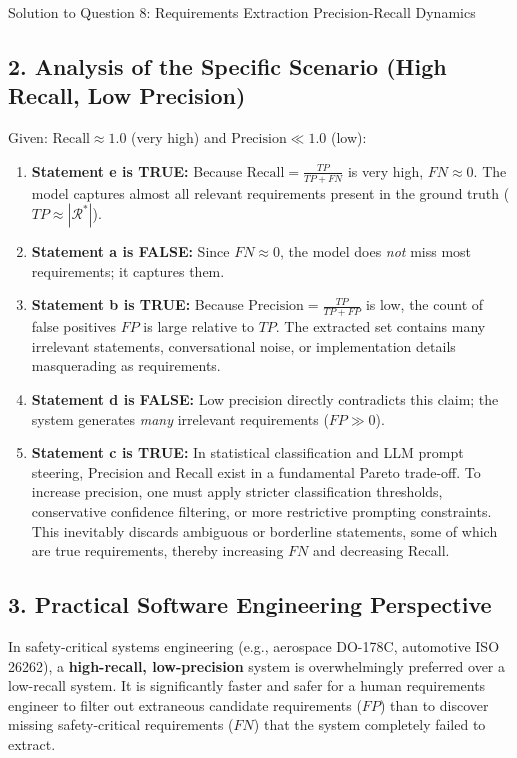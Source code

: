 \documentclass[11pt,a4paper]{article}
\begin{document}
\begin{solutionbox}{Solution to Question 8: Requirements Extraction Precision-Recall Dynamics}
\subsection*{2. Analysis of the Specific Scenario (High Recall, Low Precision)}
Given: $\text{Recall} \approx 1.0$ (very high) and $\text{Precision} \ll 1.0$ (low):
\begin{enumerate}[label=\textbf{(\alph*)},leftmargin=1.5em,itemsep=2pt]
    \item \textbf{Statement e is TRUE:} Because $\text{Recall} = \frac{TP}{TP + FN}$ is very high, $FN \approx 0$. The model captures almost all relevant requirements present in the ground truth ($TP \approx |\mathcal{R}^*|$).
    \item \textbf{Statement a is FALSE:} Since $FN \approx 0$, the model does \textit{not} miss most requirements; it captures them.
    \item \textbf{Statement b is TRUE:} Because $\text{Precision} = \frac{TP}{TP + FP}$ is low, the count of false positives $FP$ is large relative to $TP$. The extracted set contains many irrelevant statements, conversational noise, or implementation details masquerading as requirements.
    \item \textbf{Statement d is FALSE:} Low precision directly contradicts this claim; the system generates \textit{many} irrelevant requirements ($FP \gg 0$).
    \item \textbf{Statement c is TRUE:} In statistical classification and LLM prompt steering, Precision and Recall exist in a fundamental Pareto trade-off. To increase precision, one must apply stricter classification thresholds, conservative confidence filtering, or more restrictive prompting constraints. This inevitably discards ambiguous or borderline statements, some of which are true requirements, thereby increasing $FN$ and decreasing Recall.
\end{enumerate}

\subsection*{3. Practical Software Engineering Perspective}
In safety-critical systems engineering (e.g., aerospace DO-178C, automotive ISO 26262), a \textbf{high-recall, low-precision} system is overwhelmingly preferred over a low-recall system. It is significantly faster and safer for a human requirements engineer to filter out extraneous candidate requirements ($FP$) than to discover missing safety-critical requirements ($FN$) that the system completely failed to extract.
\end{solutionbox}
\end{document}
